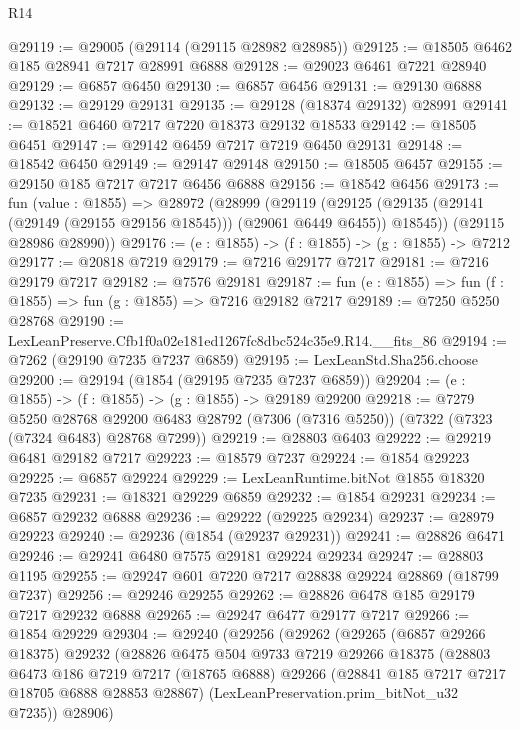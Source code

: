 \begin{lexlean}{R14}
\begin{coremodule}
@29119 := @29005 (@29114 (@29115 @28982 @28985))
@29125 := @18505 @6462 @185 @28941 @7217 @28991 @6888
@29128 := @29023 @6461 @7221 @28940
@29129 := @6857 @6450
@29130 := @6857 @6456
@29131 := @29130 @6888
@29132 := @29129 @29131
@29135 := @29128 (@18374 @29132) @28991
@29141 := @18521 @6460 @7217 @7220 @18373 @29132 @18533
@29142 := @18505 @6451
@29147 := @29142 @6459 @7217 @7219 @6450 @29131
@29148 := @18542 @6450
@29149 := @29147 @29148
@29150 := @18505 @6457
@29155 := @29150 @185 @7217 @7217 @6456 @6888
@29156 := @18542 @6456
@29173 := fun (value : @1855) =>
  @28972
    (@28999
      (@29119
        (@29125 (@29135 (@29141 (@29149 (@29155 @29156 @18545))) (@29061 @6449 @6455)) @18545))
      (@29115 @28986 @28990))
@29176 := (e : @1855) -> (f : @1855) -> (g : @1855) -> @7212
@29177 := @20818 @7219
@29179 := @7216 @29177 @7217
@29181 := @7216 @29179 @7217
@29182 := @7576 @29181
@29187 := fun (e : @1855) => fun (f : @1855) => fun (g : @1855) => @7216 @29182 @7217
@29189 := @7250 @5250 @28768
@29190 := LexLeanPreserve.Cfb1f0a02e181ed1267fc8dbc524c35e9.R14.__fits_86
@29194 := @7262 (@29190 @7235 @7237 @6859)
@29195 := LexLeanStd.Sha256.choose
@29200 := @29194 (@1854 (@29195 @7235 @7237 @6859))
@29204 := (e : @1855) -> (f : @1855) -> (g : @1855) -> @29189 @29200
@29218 := @7279
    @5250
    @28768
    @29200
    @6483
    @28792
    (@7306 (@7316 @5250))
    (@7322 (@7323 (@7324 @6483) @28768 @7299))
@29219 := @28803 @6403
@29222 := @29219 @6481 @29182 @7217
@29223 := @18579 @7237
@29224 := @1854 @29223
@29225 := @6857 @29224
@29229 := LexLeanRuntime.bitNot @1855 @18320 @7235
@29231 := @18321 @29229 @6859
@29232 := @1854 @29231
@29234 := @6857 @29232 @6888
@29236 := @29222 (@29225 @29234)
@29237 := @28979 @29223
@29240 := @29236 (@1854 (@29237 @29231))
@29241 := @28826 @6471
@29246 := @29241 @6480 @7575 @29181 @29224 @29234
@29247 := @28803 @1195
@29255 := @29247 @601 @7220 @7217 @28838 @29224 @28869 (@18799 @7237)
@29256 := @29246 @29255
@29262 := @28826 @6478 @185 @29179 @7217 @29232 @6888
@29265 := @29247 @6477 @29177 @7217
@29266 := @1854 @29229
@29304 := @29240
    (@29256
      (@29262
        (@29265
          (@6857 @29266 @18375)
          @29232
          (@28826
            @6475
            @504
            @9733
            @7219
            @29266
            @18375
            (@28803
              @6473
              @186
              @7219
              @7217
              (@18765 @6888)
              @29266
              (@28841 @185 @7217 @7217 @18705 @6888 @28853 @28867)
              (LexLeanPreservation.prim_bitNot_u32 @7235))
            @28906)

\end{coremodule}
\end{lexlean}

